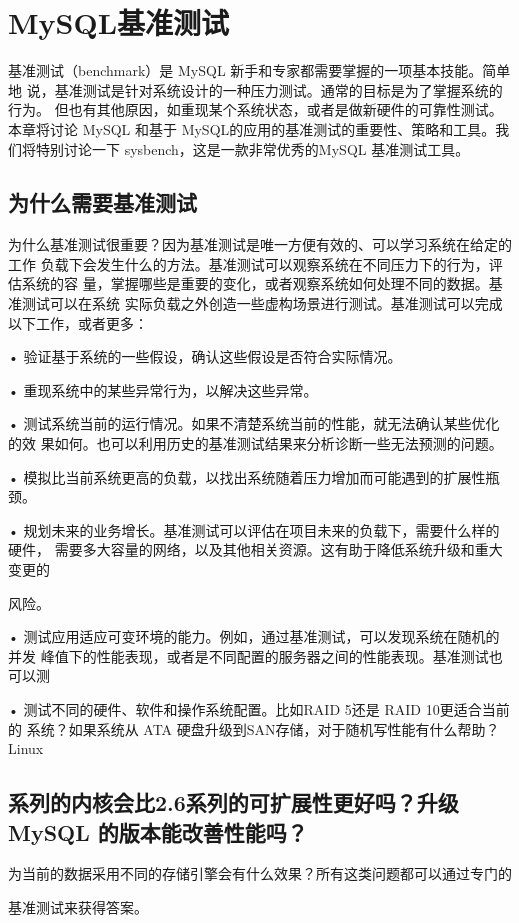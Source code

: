 \chapter{MySQL基准测试}
基准测试（benchmark）是 MySQL 新手和专家都需要掌握的一项基本技能。简单地
说，基准测试是针对系统设计的一种压力测试。通常的目标是为了掌握系统的行为。
但也有其他原因，如重现某个系统状态，或者是做新硬件的可靠性测试。本章将讨论
MySQL 和基于 MySQL的应用的基准测试的重要性、策略和工具。我们将特别讨论一下
sysbench，这是一款非常优秀的MySQL 基准测试工具。

\section{为什么需要基准测试}
为什么基准测试很重要？因为基准测试是唯一方便有效的、可以学习系统在给定的工作
负载下会发生什么的方法。基准测试可以观察系统在不同压力下的行为，评估系统的容
量，掌握哪些是重要的变化，或者观察系统如何处理不同的数据。基准测试可以在系统
实际负载之外创造一些虚构场景进行测试。基准测试可以完成以下工作，或者更多：

• 验证基于系统的一些假设，确认这些假设是否符合实际情况。

• 重现系统中的某些异常行为，以解决这些异常。

• 测试系统当前的运行情况。如果不清楚系统当前的性能，就无法确认某些优化的效
果如何。也可以利用历史的基准测试结果来分析诊断一些无法预测的问题。

• 模拟比当前系统更高的负载，以找出系统随着压力增加而可能遇到的扩展性瓶颈。

• 规划未来的业务增长。基准测试可以评估在项目未来的负载下，需要什么样的硬件，
需要多大容量的网络，以及其他相关资源。这有助于降低系统升级和重大变更的

风险。

• 测试应用适应可变环境的能力。例如，通过基准测试，可以发现系统在随机的并发
峰值下的性能表现，或者是不同配置的服务器之间的性能表现。基准测试也可以测

• 测试不同的硬件、软件和操作系统配置。比如RAID 5还是 RAID 10更适合当前的
系统？如果系统从 ATA 硬盘升级到SAN存储，对于随机写性能有什么帮助？Linux

\section{系列的内核会比2.6系列的可扩展性更好吗？升级 MySQL 的版本能改善性能吗？}
为当前的数据采用不同的存储引擎会有什么效果？所有这类问题都可以通过专门的

基准测试来获得答案。

